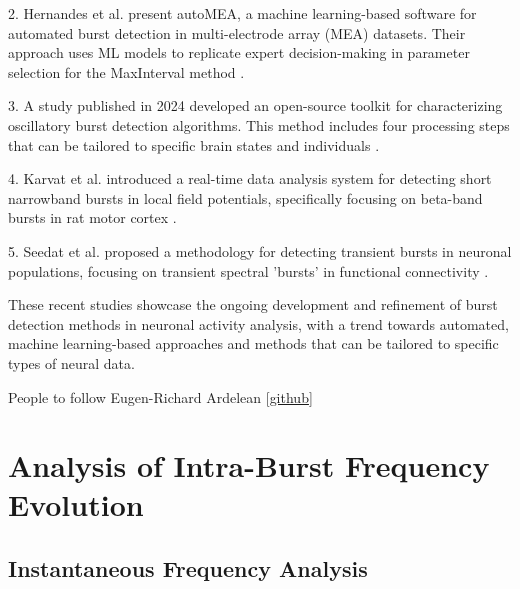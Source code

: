 \documentclass[a4paper,9pt]{extarticle}
\begin{document}
2. Hernandes et al. \cite{hernandes2024a} present autoMEA, a machine learning-based software for automated burst detection in multi-electrode array (MEA) datasets. Their approach uses ML models to replicate expert decision-making in parameter selection for the MaxInterval method \cite{hernandes2024a}.

3. A study published in 2024 developed an open-source toolkit for characterizing oscillatory burst detection algorithms. This method includes four processing steps that can be tailored to specific brain states and individuals \cite{chen_ziao2023a}.

4. Karvat et al.\cite{karvat2022a} introduced a real-time data analysis system for detecting short narrowband bursts in local field potentials, specifically focusing on beta-band bursts in rat motor cortex \cite{ardelean2023b}.

5. Seedat et al. \cite{seedat2020a} proposed a methodology for detecting transient bursts in neuronal populations, focusing on transient spectral 'bursts' in functional connectivity \cite{ardelean2023b}.

These recent studies showcase the ongoing development and refinement of burst detection methods in neuronal activity analysis, with a trend towards automated, machine learning-based approaches and methods that can be tailored to specific types of neural data.



People to follow  Eugen-Richard Ardelean [\href{https://github.com/ArdeleanRichard}{github}] \cite{muresan2022a}



\section{Analysis of Intra-Burst Frequency Evolution}




\subsection{Instantaneous Frequency Analysis}
\end{document}
